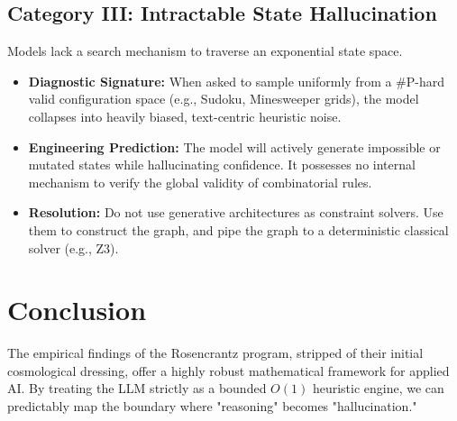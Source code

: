 \documentclass[12pt,a4paper]{article}
\begin{document}
\subsection{Category III: Intractable State Hallucination}
Models lack a search mechanism to traverse an exponential state space.
\begin{itemize}
    \item \textbf{Diagnostic Signature:} When asked to sample uniformly from a \#P-hard valid configuration space (e.g., Sudoku, Minesweeper grids), the model collapses into heavily biased, text-centric heuristic noise.
    \item \textbf{Engineering Prediction:} The model will actively generate impossible or mutated states while hallucinating confidence. It possesses no internal mechanism to verify the global validity of combinatorial rules.
    \item \textbf{Resolution:} Do not use generative architectures as constraint solvers. Use them to construct the graph, and pipe the graph to a deterministic classical solver (e.g., Z3).
\end{itemize}

\section{Conclusion}

The empirical findings of the Rosencrantz program, stripped of their initial cosmological dressing, offer a highly robust mathematical framework for applied AI. By treating the LLM strictly as a bounded $O(1)$ heuristic engine, we can predictably map the boundary where "reasoning" becomes "hallucination."
\end{document}
